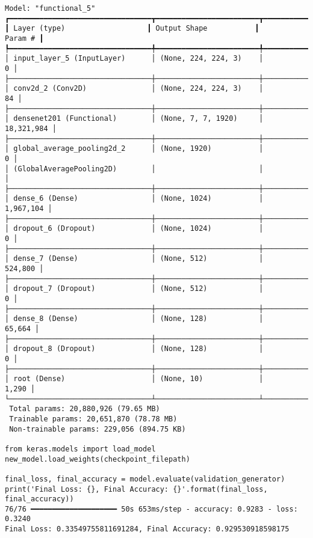 \documentclass[12pt, English]{article}
\begin{document}
\begin{normalsize}
\begin{verbatim}
Model: "functional_5"
┏━━━━━━━━━━━━━━━━━━━━━━━━━━━━━━━━━┳━━━━━━━━━━━━━━━━━━━━━━━━┳━━━━━━━━━━━━━━━┓
┃ Layer (type)                   ┃ Output Shape           ┃       Param # ┃
┡━━━━━━━━━━━━━━━━━━━━━━━━━━━━━━━━━╇━━━━━━━━━━━━━━━━━━━━━━━━╇━━━━━━━━━━━━━━━┩
│ input_layer_5 (InputLayer)      │ (None, 224, 224, 3)    │             0 │
├─────────────────────────────────┼────────────────────────┼───────────────┤
│ conv2d_2 (Conv2D)               │ (None, 224, 224, 3)    │            84 │
├─────────────────────────────────┼────────────────────────┼───────────────┤
│ densenet201 (Functional)        │ (None, 7, 7, 1920)     │    18,321,984 │
├─────────────────────────────────┼────────────────────────┼───────────────┤
│ global_average_pooling2d_2      │ (None, 1920)           │             0 │
│ (GlobalAveragePooling2D)        │                        │               │
├─────────────────────────────────┼────────────────────────┼───────────────┤
│ dense_6 (Dense)                 │ (None, 1024)           │     1,967,104 │
├─────────────────────────────────┼────────────────────────┼───────────────┤
│ dropout_6 (Dropout)             │ (None, 1024)           │             0 │
├─────────────────────────────────┼────────────────────────┼───────────────┤
│ dense_7 (Dense)                 │ (None, 512)            │       524,800 │
├─────────────────────────────────┼────────────────────────┼───────────────┤
│ dropout_7 (Dropout)             │ (None, 512)            │             0 │
├─────────────────────────────────┼────────────────────────┼───────────────┤
│ dense_8 (Dense)                 │ (None, 128)            │        65,664 │
├─────────────────────────────────┼────────────────────────┼───────────────┤
│ dropout_8 (Dropout)             │ (None, 128)            │             0 │
├─────────────────────────────────┼────────────────────────┼───────────────┤
│ root (Dense)                    │ (None, 10)             │         1,290 │
└─────────────────────────────────┴────────────────────────┴───────────────┘
 Total params: 20,880,926 (79.65 MB)
 Trainable params: 20,651,870 (78.78 MB)
 Non-trainable params: 229,056 (894.75 KB)

from keras.models import load_model
new_model.load_weights(checkpoint_filepath)

final_loss, final_accuracy = model.evaluate(validation_generator)
print('Final Loss: {}, Final Accuracy: {}'.format(final_loss, final_accuracy))
76/76 ━━━━━━━━━━━━━━━━━━━━ 50s 653ms/step - accuracy: 0.9283 - loss: 0.3240
Final Loss: 0.33549755811691284, Final Accuracy: 0.929530918598175


\end{verbatim}
\end{normalsize}
\end{document}
